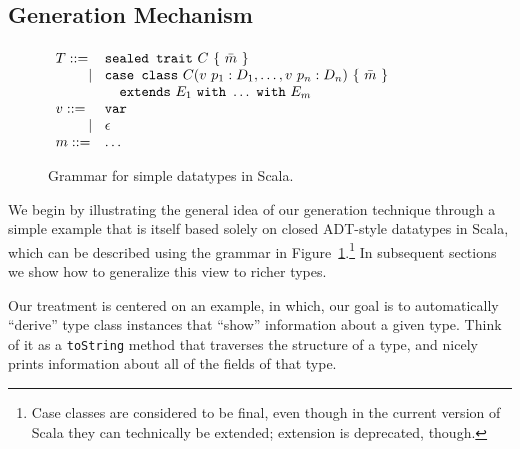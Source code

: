 \documentclass[preprint]{sigplanconf}
\newcommand{\gap}{\quad\quad}
\newcommand{\ba}{\begin{array}}
\newcommand{\ea}{\end{array}}
\begin{document}
\subsection{Generation Mechanism}\label{sec:basic-generation}



\begin{figure}
  \centering
$\ba[t]{l@{\hspace{2mm}}l@{\hspace{2mm}}}
T    ::= & \texttt{sealed trait}~C~\{~\bar{m}~\} \\
\gap ~|~ & \texttt{case class}~C(v~p_1: D_1, \ldots, v~p_n: D_n)~\{~\bar{m}~\} \\
\gap     & \texttt{~~extends}~E_1~\texttt{with}~ \ldots ~\texttt{with}~E_m \\
v    ::= & \texttt{var} \\
\gap ~|~ & \epsilon \\
m    ::= & \ldots \\
\ea$
  \caption{Grammar for simple datatypes in Scala.}
  \label{fig:type-syntax}
\end{figure}

We begin by illustrating the general idea of our generation technique through
a simple example that is itself based solely on closed ADT-style datatypes in
Scala, which can be described using the grammar in
Figure~\ref{fig:type-syntax}.\footnote{Case classes are considered to be
final, even though in the current version of Scala they can technically be
extended; extension is deprecated, though.} In subsequent sections we show how
to generalize this view to richer types.

Our treatment is centered on an example, in which, our goal is to
automatically ``derive'' type class instances that ``show'' information about
a given type. Think of it as a \verb|toString| method that traverses the
structure of a type, and nicely prints information about all of the fields of
that type.
\end{document}
